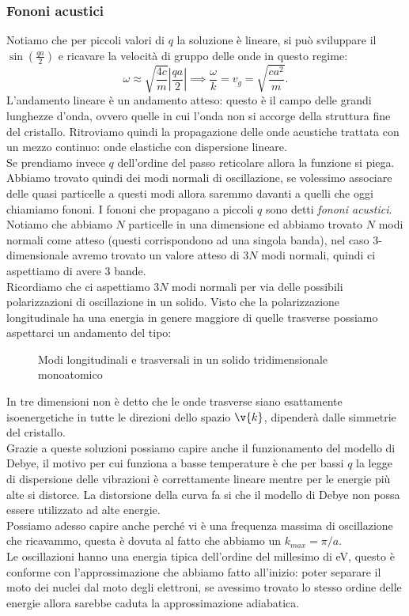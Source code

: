 \subsubsection{Fononi acustici}%
Notiamo che per piccoli valori di $q$ la soluzione è lineare, si può sviluppare il $\sin\left(\frac{qa}{2}\right)$ e ricavare la velocità di gruppo delle onde in questo regime:
\[
    \omega  \approx  \sqrt{\frac{4c}{m}} \left|\frac{qa}{2}\right| \implies \frac{\omega}{k}=v_g=\sqrt{\frac{ca^2}{m}} 
.\] 
L'andamento lineare è un andamento atteso: questo è il campo delle grandi lunghezze d'onda, ovvero quelle in cui l'onda non si accorge della struttura fine del cristallo. Ritroviamo quindi la propagazione delle onde acustiche trattata con un mezzo continuo: onde elastiche con dispersione lineare.\\
Se prendiamo invece $q$ dell'ordine del passo reticolare allora la funzione si piega. \\
Abbiamo trovato quindi dei modi normali di oscillazione, se volessimo associare delle quasi particelle a questi modi allora saremmo davanti a quelli che oggi chiamiamo fononi. I fononi che propagano a piccoli $q$ sono detti \textit{fononi acustici}.\\
Notiamo che abbiamo $N$ particelle in una dimensione ed abbiamo trovato $N$ modi normali come atteso (questi corrispondono ad una singola banda), nel caso 3-dimensionale avremo trovato un valore atteso di  $3N$ modi normali, quindi ci aspettiamo di avere 3 bande.\\
Ricordiamo che ci aspettiamo $3N$ modi normali per via delle possibili polarizzazioni di oscillazione in un solido. Visto che la polarizzazione longitudinale ha una energia in genere maggiore di quelle trasverse possiamo aspettarci un andamento del tipo:
\begin{figure}[H]
    \centering
    \caption{Modi longitudinali e trasversali in un solido tridimensionale monoatomico}
    \label{fig:modi-longitudinali-e-trasversali-in-un-solido-tridimensionale-monoatomico}
\end{figure}
\noindent
In tre dimensioni non è detto che le onde trasverse siano esattamente isoenergetiche in tutte le direzioni dello spazio $\v{k}$, dipenderà dalle simmetrie del cristallo. \\
Grazie a queste soluzioni possiamo capire anche il funzionamento del modello di Debye, il motivo per cui funziona a basse temperature è che per bassi $q$ la legge di dispersione delle vibrazioni è correttamente lineare mentre per le energie più alte si distorce. La distorsione della curva fa si che il modello di Debye non possa essere utilizzato ad alte energie. \\
Possiamo adesso capire anche perché vi è una frequenza massima di oscillazione che ricavammo, questa è dovuta al fatto che abbiamo un $k_{max} = \pi/a$.\\
Le oscillazioni hanno una energia tipica dell'ordine del millesimo di eV, questo è conforme con l'approssimazione che abbiamo fatto all'inizio: poter separare il moto dei nuclei dal moto degli elettroni, se avessimo trovato lo stesso ordine delle energie allora sarebbe caduta la approssimazione adiabatica.\\

